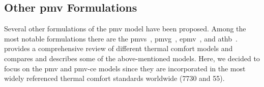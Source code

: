\subsection{Other \ac{pmv} Formulations}\label{subsec:other-pmv-formulations}
Several other formulations of the \ac{pmv} model have been proposed.
Among the most notable formulations there are the \ac{pmvs}~\cite{GaggeSET}, \ac{pmvg}~\cite{GaggeSET},  \ac{epmv}~\cite{Toftum2002}, and \ac{athb}~\cite{Schweiker2022}.
 provides a comprehensive review of different thermal comfort models and compares and describes some of the above-mentioned models.
Here, we decided to focus on the \ac{pmv} and \ac{pmv-ce} models since they are incorporated in the most widely referenced thermal comfort standards worldwide (\gls{7730} and \gls{55}).

